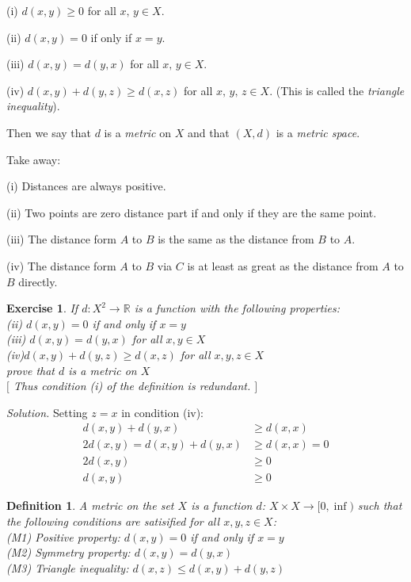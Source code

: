 \documentclass[12pt,a4paper]{article}
\theoremstyle{plain}
\newtheorem{exercise}[theorem]{Exercise}
\newtheorem{definition}[theorem]{Definition}
\begin{document}
(i) $d(x,y) \geq 0$ for all $x,\,y\in X$.

(ii) $d(x,y)=0$ if only if $x=y$. 

(iii) $d(x,y)=d(y,x)$ for all $x, \,y \in X$. 

(iv) $d(x,y)+d(y,z) \geq d(x,z)$ for all $x,\,y,\,z\in X$. (This is called the \emph{triangle inequality}).

Then we say that $d$ is a \emph{metric} on $X$ and that $(X,d)$ is a \emph{metric space}. 

Take away:

(i) Distances are always positive. 

(ii) Two points are zero distance part if and only if they are the same point.

(iii) The distance form $A$ to $B$ is the same as the distance from $B$ to $A$. 

(iv) The distance form $A$ to $B$ via $C$ is at least as great as the distance from $A$ to $B$ directly. 

\begin{exercise}
    If $d: X^2 \rightarrow \mathbb{R}$ is a function with the following properties: \\
    (ii) $d(x,y)=0$ if and only if $x=y$\\
    (iii) $d(x,y) = d(y,x)$ for all $x,y \in X$\\
    (iv)$d(x,y) + d(y,z) \geq d(x,z)$ for all $x,y,z\in X$\\
prove that $d$ is a metric on $X$ \\
$[$ Thus condition (i) of the definition is redundant. $]$
\end{exercise}

\noindent\emph{Solution.}  Setting $z=x$ in condition (iv):
\begin{equation}
    \begin{split}
        d(x,y) + d(y,x) &\geq d(x,x) \\
        2d(x,y)=d(x,y) + d(y,x) &\geq d(x, x) = 0 \\ 
        2d(x,y) &\geq 0 \\
        d(x,y) &\geq 0
    \end{split}
\end{equation}

\begin{definition}
    A \emph{metric} on the set $X$ is a function $d$: $X\times X\rightarrow [0,\inf)$ such that the following conditions are satisified for all $x,y,z\in X$:\\
(M1) Positive property: $d(x,y)=0$ if and only if $x=y$\\
(M2) Symmetry property: $d(x,y)=d(y,x)$\\
(M3) Triangle inequality: $d(x,z) \leq d(x,y) + d(y,z)$
\end{definition}
\end{document}
